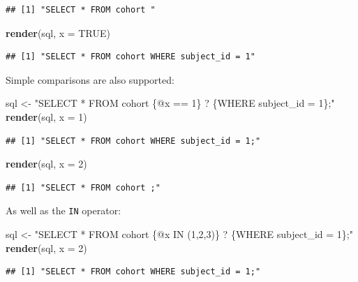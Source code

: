 \documentclass[11pt]{book}
\newenvironment{Shaded}{\begin{snugshade}}{\end{snugshade}}
\newcommand{\DataTypeTok}[1]{\textcolor[rgb]{0.13,0.29,0.53}{#1}}
\newcommand{\DecValTok}[1]{\textcolor[rgb]{0.00,0.00,0.81}{#1}}
\newcommand{\KeywordTok}[1]{\textcolor[rgb]{0.13,0.29,0.53}{\textbf{#1}}}
\newcommand{\NormalTok}[1]{#1}
\newcommand{\OtherTok}[1]{\textcolor[rgb]{0.56,0.35,0.01}{#1}}
\newcommand{\StringTok}[1]{\textcolor[rgb]{0.31,0.60,0.02}{#1}}
\theoremstyle{definition}
\theoremstyle{definition}
\theoremstyle{definition}
\theoremstyle{remark}
\begin{document}
\begin{verbatim}
## [1] "SELECT * FROM cohort "
\end{verbatim}

\begin{Shaded}
\begin{Highlighting}[]
\KeywordTok{render}\NormalTok{(sql, }\DataTypeTok{x =} \OtherTok{TRUE}\NormalTok{)}
\end{Highlighting}
\end{Shaded}

\begin{verbatim}
## [1] "SELECT * FROM cohort WHERE subject_id = 1"
\end{verbatim}

Simple comparisons are also supported:

\begin{Shaded}
\begin{Highlighting}[]
\NormalTok{sql <-}\StringTok{ "SELECT * FROM cohort \{@x == 1\} ? \{WHERE subject_id = 1\};"}
\KeywordTok{render}\NormalTok{(sql, }\DataTypeTok{x =} \DecValTok{1}\NormalTok{)}
\end{Highlighting}
\end{Shaded}

\begin{verbatim}
## [1] "SELECT * FROM cohort WHERE subject_id = 1;"
\end{verbatim}

\begin{Shaded}
\begin{Highlighting}[]
\KeywordTok{render}\NormalTok{(sql, }\DataTypeTok{x =} \DecValTok{2}\NormalTok{)}
\end{Highlighting}
\end{Shaded}

\begin{verbatim}
## [1] "SELECT * FROM cohort ;"
\end{verbatim}

As well as the \texttt{IN} operator:

\begin{Shaded}
\begin{Highlighting}[]
\NormalTok{sql <-}\StringTok{ "SELECT * FROM cohort \{@x IN (1,2,3)\} ? \{WHERE subject_id = 1\};"}
\KeywordTok{render}\NormalTok{(sql, }\DataTypeTok{x =} \DecValTok{2}\NormalTok{)}
\end{Highlighting}
\end{Shaded}

\begin{verbatim}
## [1] "SELECT * FROM cohort WHERE subject_id = 1;"
\end{verbatim}
\end{document}
